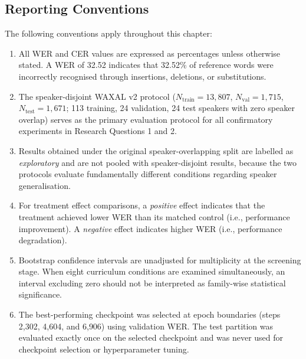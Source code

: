 \subsection{Reporting Conventions}
\label{sec:reporting-conventions}

The following conventions apply throughout this chapter:

\begin{enumerate}
    \item All WER and CER values are expressed as percentages unless otherwise
    stated. A WER of 32.52 indicates that 32.52\% of reference words were
    incorrectly recognised through insertions, deletions, or substitutions.
    
    \item The speaker-disjoint WAXAL v2 protocol ($N_{\text{train}} = 13{,}807$,
    $N_{\text{val}} = 1{,}715$, $N_{\text{test}} = 1{,}671$; 113 training, 24
    validation, 24 test speakers with zero speaker overlap) serves as the
    primary evaluation protocol for all confirmatory experiments in Research
    Questions 1 and 2.
    
    \item Results obtained under the original speaker-overlapping split are
    labelled as \textit{exploratory} and are not pooled with speaker-disjoint
    results, because the two protocols evaluate fundamentally different
    conditions regarding speaker generalisation.
    
    \item For treatment effect comparisons, a \textit{positive} effect indicates
    that the treatment achieved lower WER than its matched control (i.e.,
    performance improvement). A \textit{negative} effect indicates higher WER
    (i.e., performance degradation).
    
    \item Bootstrap confidence intervals are unadjusted for multiplicity at the
    screening stage. When eight curriculum conditions are examined
    simultaneously, an interval excluding zero should not be interpreted as
    family-wise statistical significance.
    
    \item The best-performing checkpoint was selected at epoch boundaries
    (steps 2{,}302, 4{,}604, and 6{,}906) using validation WER. The test
    partition was evaluated exactly once on the selected checkpoint and was never
    used for checkpoint selection or hyperparameter tuning.
\end{enumerate}


